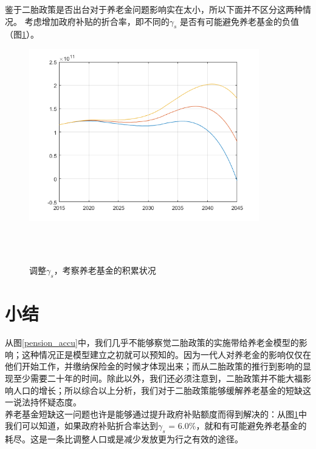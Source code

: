 \documentclass[a4paper]{article}
\begin{document}
鉴于二胎政策是否出台对于养老金问题影响实在太小，所以下面并不区分这两种情况。
考虑增加政府补贴的折合率，即不同的$\gamma_s$	是否有可能避免养老基金的负值（图\ref{pension_gamma_s}）。
	\begin{figure}[htbp]
		\centering
		\includegraphics[width=10cm]{pics/pension_gamma_s.png}
		\caption{调整$\gamma_s$，考察养老基金的积累状况} 
		 \\
		 \\
		\label{pension_gamma_s}	
	\end{figure}
\section{小结}
从图\ref{pension_accu}中，我们几乎不能够察觉二胎政策的实施带给养老金模型的影响；这种情况正是模型建立之初就可以预知的。因为一代人对养老金的影响仅仅在他们开始工作，并缴纳保险金的时候才体现出来；而从二胎政策的推行到影响的显现至少需要二十年的时间。除此以外，我们还必须注意到，二胎政策并不能大福影响人口的增长；所以综合以上分析，我们对于二胎政策能够缓解养老基金的短缺这一说法持怀疑态度。\\
\indent
养老基金短缺这一问题也许是能够通过提升政府补贴额度而得到解决的：从图\ref{pension_gamma_s}中我们可以知道，如果政府补贴折合率达到$\gamma_s$ = 6.0\%，就和有可能避免养老基金的耗尽。这是一条比调整人口或是减少发放更为行之有效的途径。
\end{document}

